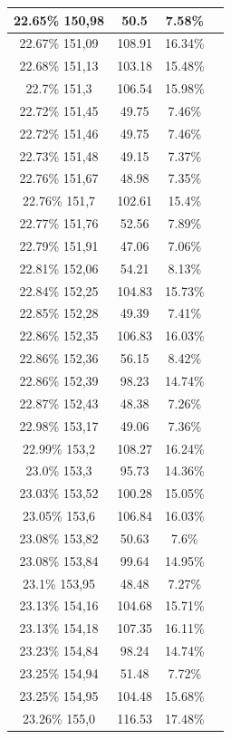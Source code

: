 \begin{center}
\begin{longtable}{|c|c|c|c|}
22.65\% 150,98 & 50.5 & 7.58\%  \\ \hline
22.67\% 151,09 & 108.91 & 16.34\%  \\ \hline
22.68\% 151,13 & 103.18 & 15.48\%  \\ \hline
22.7\% 151,3 & 106.54 & 15.98\%  \\ \hline
22.72\% 151,45 & 49.75 & 7.46\%  \\ \hline
22.72\% 151,46 & 49.75 & 7.46\%  \\ \hline
22.73\% 151,48 & 49.15 & 7.37\%  \\ \hline
22.76\% 151,67 & 48.98 & 7.35\%  \\ \hline
22.76\% 151,7 & 102.61 & 15.4\%  \\ \hline
22.77\% 151,76 & 52.56 & 7.89\%  \\ \hline
22.79\% 151,91 & 47.06 & 7.06\%  \\ \hline
22.81\% 152,06 & 54.21 & 8.13\%  \\ \hline
22.84\% 152,25 & 104.83 & 15.73\%  \\ \hline
22.85\% 152,28 & 49.39 & 7.41\%  \\ \hline
22.86\% 152,35 & 106.83 & 16.03\%  \\ \hline
22.86\% 152,36 & 56.15 & 8.42\%  \\ \hline
22.86\% 152,39 & 98.23 & 14.74\%  \\ \hline
22.87\% 152,43 & 48.38 & 7.26\%  \\ \hline
22.98\% 153,17 & 49.06 & 7.36\%  \\ \hline
22.99\% 153,2 & 108.27 & 16.24\%  \\ \hline
23.0\% 153,3 & 95.73 & 14.36\%  \\ \hline
23.03\% 153,52 & 100.28 & 15.05\%  \\ \hline
23.05\% 153,6 & 106.84 & 16.03\%  \\ \hline
23.08\% 153,82 & 50.63 & 7.6\%  \\ \hline
23.08\% 153,84 & 99.64 & 14.95\%  \\ \hline
23.1\% 153,95 & 48.48 & 7.27\%  \\ \hline
23.13\% 154,16 & 104.68 & 15.71\%  \\ \hline
23.13\% 154,18 & 107.35 & 16.11\%  \\ \hline
23.23\% 154,84 & 98.24 & 14.74\%  \\ \hline
23.25\% 154,94 & 51.48 & 7.72\%  \\ \hline
23.25\% 154,95 & 104.48 & 15.68\%  \\ \hline
23.26\% 155,0 & 116.53 & 17.48\%  \\ \hline

\end{longtable}
\end{center}
